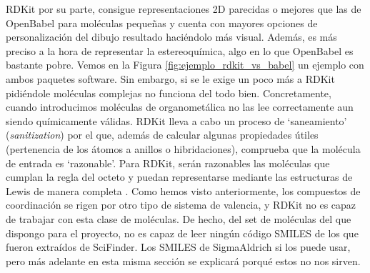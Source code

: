 RDKit por su parte, consigue representaciones 2D parecidas o mejores que las de OpenBabel para moléculas pequeñas y cuenta con mayores opciones de personalización del dibujo resultado \cite{rdkit_cookbook} haciéndolo más visual. Además, es más preciso a la hora de representar la estereoquímica, algo en lo que OpenBabel es bastante pobre. Vemos en la Figura \ref{fig:ejemplo_rdkit_vs_babel} un ejemplo con ambos paquetes software. Sin embargo, si se le exige un poco más a RDKit pidiéndole moléculas complejas no funciona del todo bien. Concretamente, cuando introducimos moléculas de organometálica no las lee correctamente aun siendo químicamente válidas. RDKit lleva a cabo un proceso de `saneamiento' (\textit{sanitization}) \cite{rdkit_docbook} por el que, además de calcular algunas propiedades útiles (pertenencia de los átomos a anillos o hibridaciones), comprueba que la molécula de entrada es `razonable'. Para RDKit, serán razonables las moléculas que cumplan la regla del octeto \cite{lewis2} y puedan representarse mediante las estructuras de Lewis de manera completa \cite{lewis_2013, lewis2}. Como hemos visto anteriormente, los compuestos de coordinación se rigen por otro tipo de sistema de valencia, y RDKit no es capaz de trabajar con esta clase de moléculas. De hecho, del set de moléculas del que dispongo para el proyecto, no es capaz de leer ningún código SMILES de los que fueron extraídos de SciFinder. Los SMILES de SigmaAldrich si los puede usar, pero más adelante en esta misma sección se explicará porqué estos no nos sirven.

